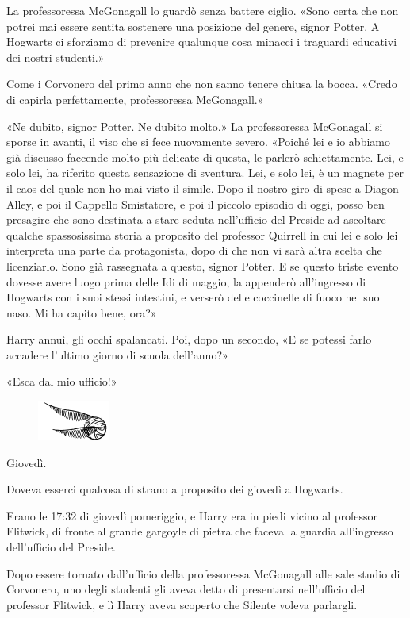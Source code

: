 La professoressa McGonagall lo guardò senza battere ciglio. «Sono certa che non potrei mai essere sentita sostenere una posizione del genere, signor Potter. A Hogwarts ci sforziamo di prevenire qualunque cosa minacci i traguardi educativi dei nostri studenti.»

Come i Corvonero del primo anno che non sanno tenere chiusa la bocca. «Credo di capirla perfettamente, professoressa McGonagall.»

«Ne dubito, signor Potter. Ne dubito molto.» La professoressa McGonagall si sporse in avanti, il viso che si fece nuovamente severo. «Poiché lei e io abbiamo già discusso faccende molto più delicate di questa, le parlerò schiettamente. Lei, e solo lei, ha riferito questa sensazione di sventura. Lei, e solo lei, è un magnete per il caos del quale non ho mai visto il simile. Dopo il nostro giro di spese a Diagon Alley, e poi il Cappello Smistatore, e poi il piccolo episodio di oggi, posso ben presagire che sono destinata a stare seduta nell’ufficio del Preside ad ascoltare qualche spassosissima storia a proposito del professor Quirrell in cui lei e solo lei interpreta una parte da protagonista, dopo di che non vi sarà altra scelta che licenziarlo. Sono già rassegnata a questo, signor Potter. E se questo triste evento dovesse avere luogo prima delle Idi di maggio, la appenderò all’ingresso di Hogwarts con i suoi stessi intestini, e verserò delle coccinelle di fuoco nel suo naso. Mi ha capito bene, ora?»

Harry annuì, gli occhi spalancati. Poi, dopo un secondo, «E se potessi farlo accadere l’ultimo giorno di scuola dell’anno?»

«Esca dal mio ufficio!»

\begin{figure}[h!]
        \includegraphics[scale=0.4]{boccino.png}
        \centering
\end{figure}

Giovedì.

Doveva esserci qualcosa di strano a proposito dei giovedì a Hogwarts.

Erano le 17:32 di giovedì pomeriggio, e Harry era in piedi vicino al professor Flitwick, di fronte al grande gargoyle di pietra che faceva la guardia all’ingresso dell’ufficio del Preside.

Dopo essere tornato dall’ufficio della professoressa McGonagall alle sale studio di Corvonero, uno degli studenti gli aveva detto di presentarsi nell’ufficio del professor Flitwick, e lì Harry aveva scoperto che Silente voleva parlargli.

